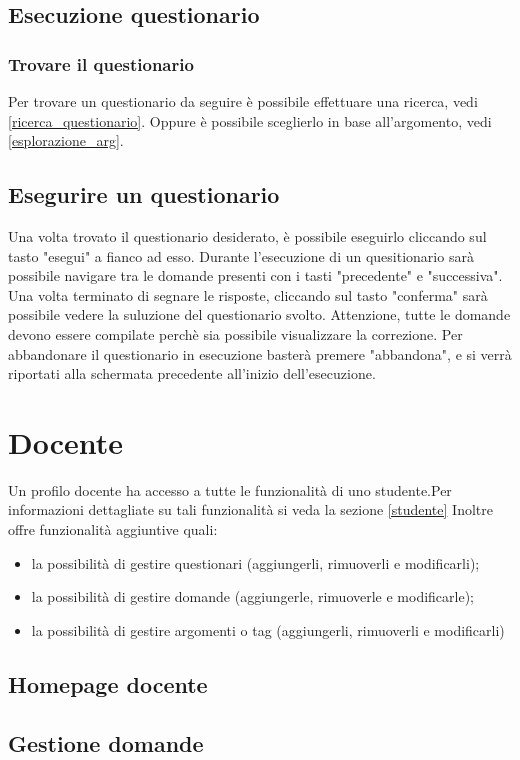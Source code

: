 \documentclass[12pt,a4paper]{article}
\begin{document}
	\subsection{Esecuzione questionario}
	\subsubsection{Trovare il questionario}
		Per trovare un questionario da seguire è possibile effettuare una ricerca, vedi \ref{ricerca_questionario}.
		Oppure è possibile sceglierlo in base all'argomento, vedi \ref{esplorazione_arg}.
	\subsection{Esegurire un questionario}
	Una  volta trovato il questionario desiderato, è possibile eseguirlo cliccando sul tasto "esegui" a fianco ad esso.
	Durante l'esecuzione di un quesitionario sarà possibile navigare tra le domande presenti con i tasti "precedente" e "successiva".
	Una volta terminato di segnare le risposte, cliccando sul tasto "conferma" sarà possibile vedere la suluzione del questionario svolto.
	Attenzione, tutte le domande devono essere compilate perchè sia possibile visualizzare la correzione.
	Per abbandonare il questionario in esecuzione basterà premere "abbandona", e si verrà riportati alla schermata precedente all'inizio dell'esecuzione.
	
	\section{Docente}\label{docente}
	Un profilo docente ha accesso a tutte le funzionalità di uno studente.Per informazioni dettagliate su tali funzionalità si veda la sezione \ref{studente}
		Inoltre offre funzionalità aggiuntive quali:
		\begin{itemize}
			\item la possibilità di gestire questionari (aggiungerli, rimuoverli e modificarli);
			\item la possibilità di gestire domande (aggiungerle, rimuoverle e modificarle);
			\item la possibilità di gestire argomenti o tag (aggiungerli, rimuoverli e modificarli)
		\end{itemize}
	\subsection{Homepage docente}
	
    \subsection{Gestione domande}
\end{document}
